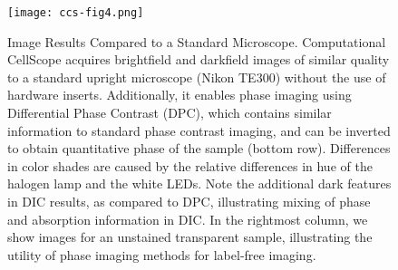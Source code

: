 {{%
\begin{figure}
\begin{center}
\texttt{[image: ccs-fig4.png]}
\end{center}
\caption {{Image Results Compared to a Standard Microscope.} Computational CellScope acquires brightfield and darkfield images of similar quality to a standard upright microscope (Nikon TE300) without the use of hardware inserts. Additionally, it enables phase imaging using Differential Phase Contrast (DPC), which contains similar information to standard phase contrast imaging, and can be inverted to obtain quantitative phase of the sample (bottom row). Differences in color shades are caused by the relative differences in hue of the halogen lamp and the white LEDs. Note the additional dark features in DIC results, as compared to DPC, illustrating mixing of phase and absorption information in DIC. In the rightmost column, we show images for an unstained transparent sample, illustrating the utility of phase imaging methods for label-free imaging.
}
\label{fig:contrastcomparison}
\end{figure}





}}

